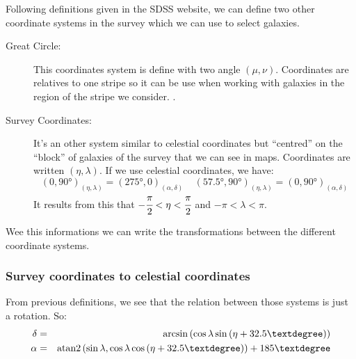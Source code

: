 Following definitions given in the SDSS website, we can define two other
coordinate systems in the survey which we can use to select galaxies.
\begin{description}
    \item[Great Circle:] This coordinates system is define with two angle
        $(\mu, \nu)$. Coordinates are relatives to one stripe so it can be use
        when working with galaxies in the region of the stripe we consider.
        .

    \item[Survey Coordinates:] It's an other system similar to celestial
        coordinates but ``centred'' on the ``block'' of galaxies of the survey that
        we can see in maps. Coordinates are written $(\eta,\lambda)$. If we use
        celestial coordinates, we have:
    \begin{equation}
            {(0,90°)}_{(\eta,\lambda)}={(275°,0)}_{(\alpha,\delta)}\;\;\;\;
            {(57.5°,90°)}_{(\eta,\lambda)}={(0,90°)}_{(\alpha,\delta)}
    \end{equation}
    It results from this that $-\cfrac{\pi}{2}<\eta<\cfrac{\pi}{2}$ and $-\pi<\lambda<\pi$.
\end{description}

Wee this informations we can write the transformations between the different
coordinate systems.
%
\subsubsection{Survey coordinates to celestial coordinates}
%
From previous definitions, we see that the relation between those systems is
just a rotation. So:
\begin{eqnarray}
        \delta &=& \arcsin\pg\cos\lambda\sin\pg\eta+32.5°\pd\pd\nonumber\\
        \alpha &=& \mathrm{atan2}\pg\sin\lambda,\cos\lambda\cos\pg\eta+32.5°\pd\pd+185°\nonumber\\
\end{eqnarray}
%
